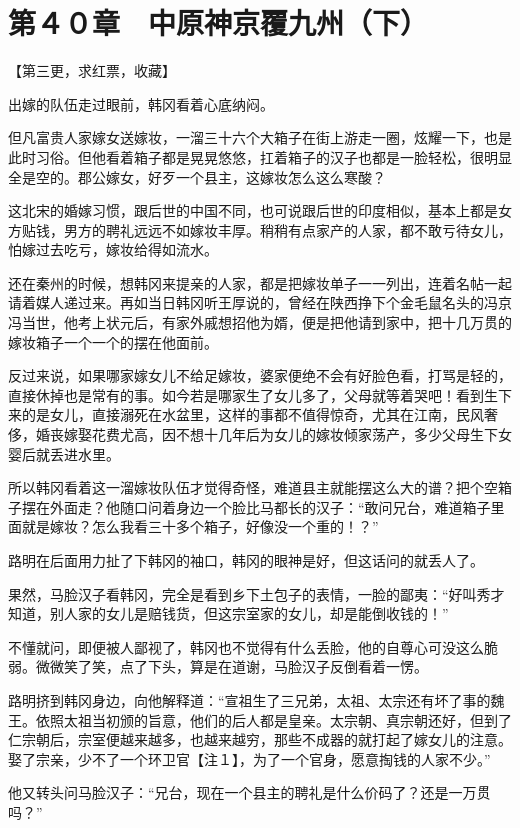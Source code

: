 \section{第４０章　中原神京覆九州（下）}

【第三更，求红票，收藏】

出嫁的队伍走过眼前，韩冈看着心底纳闷。

但凡富贵人家嫁女送嫁妆，一溜三十六个大箱子在街上游走一圈，炫耀一下，也是此时习俗。但他看着箱子都是晃晃悠悠，扛着箱子的汉子也都是一脸轻松，很明显全是空的。郡公嫁女，好歹一个县主，这嫁妆怎么这么寒酸？

这北宋的婚嫁习惯，跟后世的中国不同，也可说跟后世的印度相似，基本上都是女方贴钱，男方的聘礼远远不如嫁妆丰厚。稍稍有点家产的人家，都不敢亏待女儿，怕嫁过去吃亏，嫁妆给得如流水。

还在秦州的时候，想韩冈来提亲的人家，都是把嫁妆单子一一列出，连着名帖一起请着媒人递过来。再如当日韩冈听王厚说的，曾经在陕西挣下个金毛鼠名头的冯京冯当世，他考上状元后，有家外戚想招他为婿，便是把他请到家中，把十几万贯的嫁妆箱子一个一个的摆在他面前。

反过来说，如果哪家嫁女儿不给足嫁妆，婆家便绝不会有好脸色看，打骂是轻的，直接休掉也是常有的事。如今若是哪家生了女儿多了，父母就等着哭吧！看到生下来的是女儿，直接溺死在水盆里，这样的事都不值得惊奇，尤其在江南，民风奢侈，婚丧嫁娶花费尤高，因不想十几年后为女儿的嫁妆倾家荡产，多少父母生下女婴后就丢进水里。

所以韩冈看着这一溜嫁妆队伍才觉得奇怪，难道县主就能摆这么大的谱？把个空箱子摆在外面走？他随口问着身边一个脸比马都长的汉子：“敢问兄台，难道箱子里面就是嫁妆？怎么我看三十多个箱子，好像没一个重的！？”

路明在后面用力扯了下韩冈的袖口，韩冈的眼神是好，但这话问的就丢人了。

果然，马脸汉子看韩冈，完全是看到乡下土包子的表情，一脸的鄙夷：“好叫秀才知道，别人家的女儿是赔钱货，但这宗室家的女儿，却是能倒收钱的！”

不懂就问，即便被人鄙视了，韩冈也不觉得有什么丢脸，他的自尊心可没这么脆弱。微微笑了笑，点了下头，算是在道谢，马脸汉子反倒看着一愣。

路明挤到韩冈身边，向他解释道：“宣祖生了三兄弟，太祖、太宗还有坏了事的魏王。依照太祖当初颁的旨意，他们的后人都是皇亲。太宗朝、真宗朝还好，但到了仁宗朝后，宗室便越来越多，也越来越穷，那些不成器的就打起了嫁女儿的注意。娶了宗亲，少不了一个环卫官【注１】，为了一个官身，愿意掏钱的人家不少。”

他又转头问马脸汉子：“兄台，现在一个县主的聘礼是什么价码了？还是一万贯吗？”

